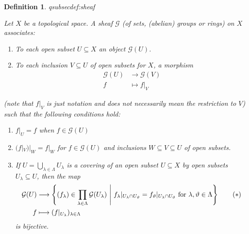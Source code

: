 \documentclass[DIV=14,parskip=full,pointednumbers]{scrartcl}
\renewenvironment{itemize}{\begin{enumerate}[label={$\bullet$},ref=\curthm]}{\end{enumerate}}
\theoremstyle{cthm}
\theoremstyle{cvarthm}
\theoremstyle{cdef}
\newtheorem{defi}{Definition}[subsection]
\newcommand{\lbl}[1]{
	\label{#1}
	\ifmmode
	\expandafter\xdef\csname eqsubsec#1\endcsname{\thesubsection}
	\fi
}
\newcommand{\Gg}{\mathcal{G}}
\newcommand{\longto}{\longrightarrow}
\newcommand{\st}{\ \middle|\ }
\begin{document}
	\begin{defi}\lbl{def:sheaf}
		Let $X$ be a topological space. A \emph{sheaf} $\Gg$ (of sets, (abelian) groups or rings) on $X$ associates:
		\begin{itemize}
			\item To each open subset $U\subseteq X$ an object $\Gg(U)$.
			\item To each inclusion $V\subseteq U$ of open subsets for $X$, a morphism
			\begin{align*}
			\Gg(U) &\longto\Gg(V)\\
			f&\longmapsto f|_V
			\end{align*}
		\end{itemize}
		(note that $f|_V$ is just notation and does not necessarily mean the restriction to $V$) such that the following conditions hold:
		\begin{itemize}
			\item[$(\alpha)$] $f|_U = f$ when $f\in \Gg(U)$
			\item[$(\beta)$] $(f|_V)|_W = f|_W$ for $f\in \Gg(U)$ and inclusions $W\subseteq V\subseteq U$ of open subsets.
			\item[$(\gamma)$] If $U = \bigcup_{\lambda\in\Lambda} U_\lambda$ is a covering of an open subset $U\subseteq X$ by open subsets $U_\lambda \subseteq U$, then the map
			\begin{align*}\lbl{eq:sheafGamma}
			\Gg(U) &\longto \left\{(f_\lambda)\in \prod_{\lambda\in\Lambda} \Gg (U_\lambda)\st f_\lambda|_{U_\lambda\cap U_\vartheta} = f_\vartheta|_{U_\lambda\cap U_\vartheta} \text{ for }\lambda,\vartheta\in \Lambda\right\}\tag{$*$}\\
			f &\longmapsto (f|_{U_\lambda})_{\lambda\in\Lambda}
			\end{align*}
			is bijective.
		\end{itemize}
	\end{defi}
\end{document}
